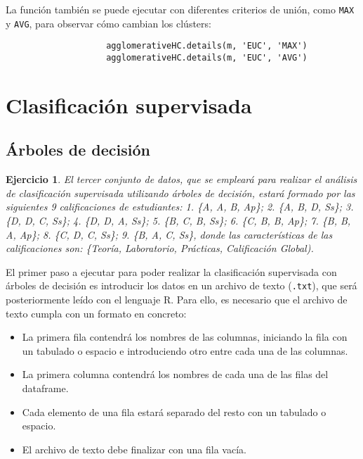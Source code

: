 \documentclass[12pt]{report}\usepackage[]{graphicx}\usepackage[dvipsnames]{xcolor}
\newtheorem{exercise}{Ejercicio}[section]
\begin{document}
				La función también se puede ejecutar con diferentes criterios de unión, como \texttt{MAX} y \texttt{AVG}, para observar cómo cambian los clústers:
				
				\begin{verbatim}
					agglomerativeHC.details(m, 'EUC', 'MAX')
					agglomerativeHC.details(m, 'EUC', 'AVG')
				\end{verbatim}
		
		\section{Clasificación supervisada}
		
			\subsection{Árboles de decisión}
		
				\begin{exercise}
					El tercer conjunto de datos, que se empleará para realizar el análisis de clasificación supervisada utilizando árboles de decisión, estará formado por las siguientes 9 calificaciones de estudiantes: 1. \{A, A, B, Ap\}; 2. \{A, B, D, Ss\}; 3. \{D, D, C, Ss\}; 4. \{D, D, A, Ss\}; 5. \{B, C, B, Ss\}; 6. \{C, B, B, Ap\}; 7. \{B, B, A, Ap\}; 8. \{C, D, C, Ss\}; 9. \{B, A, C,
					Ss\}, donde las características de las calificaciones son: \{Teoría, Laboratorio, Prácticas, Calificación Global).
				\end{exercise}
				
				El primer paso a ejecutar para poder realizar la clasificación supervisada con árboles de decisión es introducir los datos en un archivo de texto (\texttt{.txt}), que será posteriormente leído con el lenguaje R. Para ello, es necesario que el archivo de texto cumpla con un formato en concreto:
				
				\begin{itemize}
					\item La primera fila contendrá los nombres de las columnas, iniciando la fila con un tabulado o espacio e introduciendo otro entre cada una de las columnas.
					\item La primera columna contendrá los nombres de cada una de las filas del dataframe.
					\item Cada elemento de una fila estará separado del resto con un tabulado o espacio.
					\item El archivo de texto debe finalizar con una fila vacía.
				\end{itemize}
				
\end{document}
